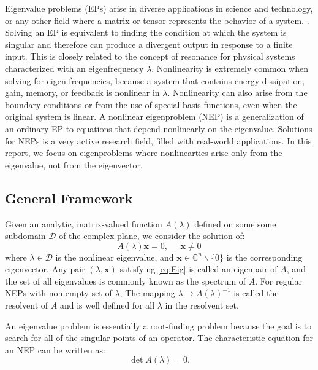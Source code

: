\documentclass[11pt,letterpaper]{article}
\begin{document}
Eigenvalue problems (EPs) arise in diverse applications in science and technology, or any other field where a matrix or tensor represents the behavior of a system. \citep{guillaume_nonlinear_1999, betcke2013nlevp}. Solving an EP is equivalent to finding the condition at which the system is singular and therefore can produce a divergent output in response to a finite input. This is closely related to the concept of resonance for physical systems characterized with an eigenfrequency $\lambda$. Nonlinearity is extremely common when solving for eigen-frequencies, because a system that contains energy dissipation, gain, memory, or feedback is nonlinear in $\lambda$. Nonlinearity can also arise from the boundary conditions or from the use of special basis functions, even when the original system is linear. A nonlinear eigenproblem (NEP) is a generalization of an ordinary EP to equations that depend nonlinearly on the eigenvalue. Solutions for NEPs is a very active research field, filled with real-world applications. In this report, we focus on eigenproblems where nonlinearties arise only from the eigenvalue, not from the eigenvector.  

\pagebreak
\subsection{General Framework}
Given an analytic, matrix-valued function $A(\lambda)$ defined on some some subdomain $\mathcal{D}$ of the complex plane, we consider the solution of:
\begin{equation}\label{eq:Eig}
    A(\lambda) \mathbf{x} = 0,\;\;\;\;\;\mathbf{x}\neq 0
\end{equation}
where $\lambda \in \mathcal{D}$ is the nonlinear eigenvalue, and $\mathbf{x} \in \mathbb{C}^n\backslash\{0\}$ is the corresponding eigenvector. Any pair $(\lambda, \mathbf{x})$ satisfying \ref{eq:Eig} is called an eigenpair of $A$, and the set of all eigenvalues is commonly known as the spectrum of $A$. For regular NEPs with non-empty set of $\lambda$, The mapping $\lambda \mapsto A(\lambda)^{-1}$ is called the resolvent of $A$ and is well defined for all $\lambda$ in the resolvent set. 


An eigenvalue problem is essentially a root-finding problem because the goal is to search for all of the singular points of an operator. The characteristic equation for an NEP can be written as:
\begin{equation}\label{eq:charNEP}
\det A(\lambda) = 0. 
\end{equation}
\end{document}
